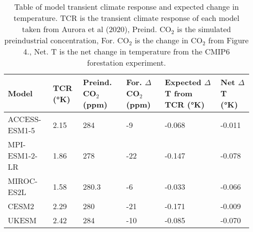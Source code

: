 \documentclass[]{article}
\begin{document}
\begin{table}[]
\begin{tabular}{llllll}
\hline
Model         & TCR (°K) & Preind. CO$_2$ (ppm) & For. $\Delta$CO$_2$ (ppm) & Expected $\Delta$T from TCR (°K) & Net $\Delta$T (°K) \\ \hline
ACCESS-ESM1-5 & 2.15     & 284               & -9              & -0.068                    & -0.011      \\
MPI-ESM1-2-LR & 1.86     & 278               & -22             & -0.147                    & -0.078      \\
MIROC-ES2L    & 1.58     & 280.3             & -6              & -0.033                    & -0.066      \\
CESM2         & 2.29     & 280               & -21             & -0.171                    & -0.009      \\
UKESM         & 2.42     & 284               & -10             & -0.085                    & -0.070      \\ \hline
\end{tabular}
    \caption{Table of model transient climate response and expected change in temperature. TCR is the transient climate response of each model taken from Aurora et al (2020), Preind. CO$_2$ is the simulated preindustrial concentration, For. CO$_2$ is the change in CO$_2$ from Figure 4., Net. T is the net change in temperature from the CMIP6 forestation experiment.}
    \label{tab:expected_temperature}
\end{table}
\end{document}

